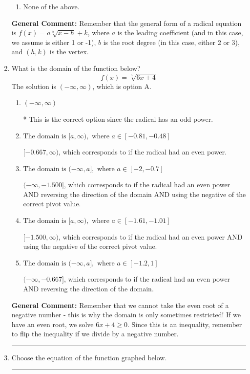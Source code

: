 \documentclass{extbook}[14pt]
\newcommand{\litem}[1]{\item #1

\rule{\textwidth}{0.4pt}}
\begin{document}
\begin{enumerate}
{\begin{enumerate}[label=\Alph*.]
\item None of the above.\end{enumerate}
\textbf{General Comment:} Remember that the general form of a radical equation is $ f(x) = a \sqrt[b]{x - h} + k $, where $a$ is the leading coefficient (and in this case, we assume is either 1 or -1), $b$ is the root degree (in this case, either 2 or 3), and $(h, k)$ is the vertex.
}
\litem{
What is the domain of the function below?
\[ f(x) = \sqrt[5]{6 x + 4} \]The solution is \( (-\infty, \infty) \), which is option A.\begin{enumerate}[label=\Alph*.]
\item \( (-\infty, \infty) \)

* This is the correct option since the radical has an odd power.
\item \( \text{The domain is } [a, \infty), \text{   where } a \in [-0.81, -0.48] \)

$[-0.667, \infty)$, which corresponds to if the radical had an even power.
\item \( \text{The domain is } (-\infty, a], \text{   where } a \in [-2, -0.7] \)

$(-\infty, -1.500]$, which corresponds to if the radical had an even power AND reversing the direction of the domain AND using the negative of the correct pivot value.
\item \( \text{The domain is } [a, \infty), \text{   where } a \in [-1.61, -1.01] \)

$[-1.500, \infty)$, which corresponds to if the radical had an even power AND using the negative of the correct pivot value.
\item \( \text{The domain is } (-\infty, a], \text{   where } a \in [-1.2, 1] \)

$(-\infty, -0.667]$, which corresponds to if the radical had an even power AND reversing the direction of the domain.
\end{enumerate}

\textbf{General Comment:} Remember that we cannot take the even root of a negative number - this is why the domain is only sometimes restricted! If we have an even root, we solve $6 x + 4 \geq 0$. Since this is an inequality, remember to flip the inequality if we divide by a negative number.
}
\litem{
Choose the equation of the function graphed below.

}
\end{enumerate}
\end{document}

